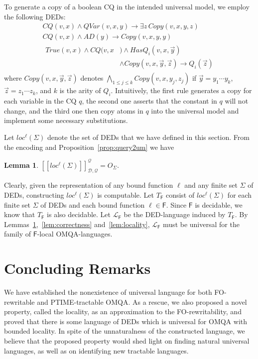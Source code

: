 \documentclass[letterpaper]{article} %
\newtheorem{lem}[thm]{Lemma}
\theoremstyle{definition}
\theoremstyle{remark}
\theoremstyle{definition}
\begin{document}
To generate a copy of a boolean CQ in the intended universal model, we employ the following DEDs:
\begin{eqnarray}
\textit{CQ}(v,x)\wedge\textit{QVar}(v,x,y)\rightarrow\exists z\,\textit{Copy}(v,x,y,z)\\
\textit{CQ}(v,x)\wedge\textit{AD}(y)\rightarrow\textit{Copy}(v,x,y,y)\\
\begin{aligned}
\textit{True}(v,x)\wedge\textit{CQ}(v,x&)\wedge\textit{HasQ}_i(v,x,\vec{y})\\
&\wedge\textit{Copy}(v,x,\vec{y},\vec{z})\rightarrow\textit{Q}_i(\vec{z})
\end{aligned}
\end{eqnarray}
where $\textit{Copy}(v,x,\vec{y},\vec{z})$ denotes $\bigwedge_{1\le j\le k}\textit{Copy}(v,x,y_j,z_j)$ if $\vec{y}=y_1\cdots y_k$, $\vec{z}=z_1\cdots z_k$, and $k$ is the arity of $\textit{Q}_i$. Intuitively, the first rule generates a copy for each variable in the CQ $q$, the second one asserts that the constant in $q$ will not change, and the third one then copy atoms in $q$ into the universal model and implement some necessary substitutions.   

\medskip
Let $loc^\ell(\Sigma)$ denote the set of DEDs that we have defined in this section. From the encoding and Proposition~\ref{prop:query2um} we have 
\begin{lem}\label{lem:soundness}
$[\![loc^\ell(\Sigma)]\!]_{\mathscr{D},\mathscr{Q}}^{\mathcal{Q}}=O_\Sigma$.
\end{lem}

Clearly, given the representation of any bound function $\ell$ and any finite set $\Sigma$ of DEDs, constructing $loc^\ell(\Sigma)$ is computable. Let $T_\mathsf{F}$ consist of $loc^\ell(\Sigma)$ for each finite set $\Sigma$ of DEDs and each bound function $\ell\in\mathsf{F}$. Since $\mathsf{F}$ is decidable, we know that $T_\mathsf{F}$ is also decidable. Let $\mathcal{L}_\mathsf{F}$ be the DED-language induced by $T_{\mathsf{F}}$. By Lemmas~\ref{lem:soundness},~\ref{lem:correctness} and~\ref{lem:locality}, $\mathcal{L}_\mathsf{F}$ must be universal for the family of $\mathsf{F}$-local OMQA-languages.

\section{Concluding Remarks}

We have established the nonexistence of universal language for both FO-rewritable and PTIME-tractable OMQA. As a rescue, we also proposed a novel property, called the locality, as an approximation to the FO-rewritability, and proved that there is some language of DEDs which is universal for OMQA with bounded locality. In spite of the unnaturalness of the constructed language, we believe that the proposed property would shed light on finding natural universal languages, as well as on identifying new tractable languages.
\end{document}
